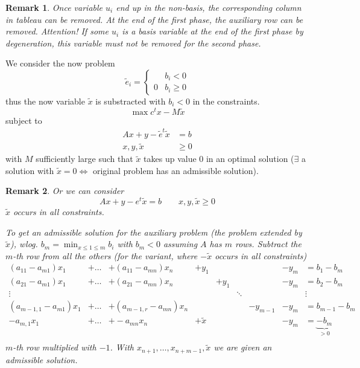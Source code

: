 \documentclass{article}
\numberwithin{lecref}{section}
\newtheorem*{Remark}{Remark}
\begin{document}
\begin{Remark}
	Once variable $u_i$ end up in the non-basis, the corresponding column in tableau can be removed. At the end of the first phase, the auxiliary row can be removed. Attention! If some $u_i$ is a basis variable at the end of the first phase by degeneration, this variable must not be removed for the second phase.
\end{Remark}

We consider the now problem
\[ \tilde e_i = \begin{cases}  & b_i < 0 \\ 0 & b_i \geq 0 \end{cases} \]
thus the now variable $\tilde x$ is substracted with $b_i < 0$ in the constraints.
\[ \max c^t x - M \tilde x \]
subject to
\begin{align*}
	Ax + y - \tilde e^t \tilde x &= b \\
	x, y, \tilde x &\geq 0
\end{align*}
with $M$ sufficiently large such that $\tilde x$ takes up value 0 in an optimal solution ($\exists$ a solution with $\tilde x = 0 \iff$ original problem has an admissible solution).

\begin{Remark}
	Or we can consider 
	\[ Ax + y - e^t \tilde x = b \qquad x, y, \tilde x \geq 0 \]
	$\tilde x$ occurs in all constraints.

	To get an admissible solution for the auxiliary problem (the problem extended by $\tilde x$), wlog. $b_m = \min_{x \leq 1 \leq m} b_i$ with $b_m < 0$ assuming $A$ has $m$ rows.
	Subtract the $m$-th row from all the others (for the variant, where $-\tilde x$ occurs in all constraints)
	\begin{align}
		\label{mat}
		(a_{11} - a_{m1}) x_1 &+ \dots &+ (a_{11} - a_{mn}) x_n &+ y_1  &       &        &          & -y_m &= b_1 - b_m \\
		(a_{21} - a_{m1}) x_1 &+ \dots &+ (a_{21} - a_{mn}) x_n &       &+ y_1  &        &          & -y_m &= b_2 - b_m \nonumber\\
		\vdots                &        &                        &       &       & \ddots &          &      &\vdots \nonumber\\
		(a_{m-1,1} - a_{m1}) x_1 &+ \dots &+ (a_{m-1,r} - a_{mn}) x_n & &       &        & -y_{m-1} & -y_m &= b_{m-1} - b_m \nonumber\\
		-a_{m,1} x_1 &+ \dots &+ -a_{mn} x_n & + \tilde x &       &        &  & -y_m &= \underbrace{-b_{m}}_{>0} \nonumber\\
	\end{align}
	$m$-th row multiplied with $-1$.
	With $x_{n+1}, \dots, x_{n+m-1}, \tilde x$ we are given an admissible solution.
\end{Remark}
\end{document}
